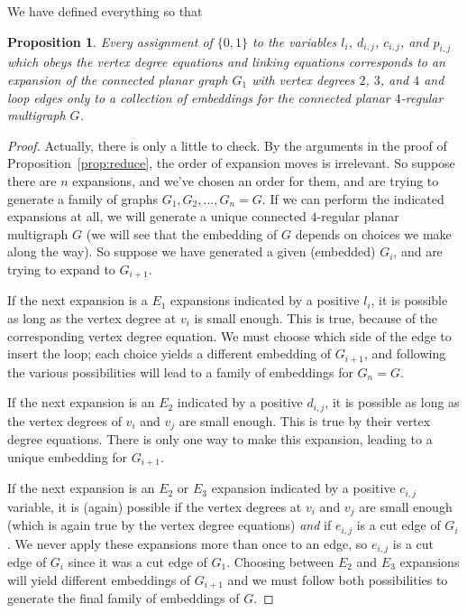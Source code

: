 \documentclass[amsmath,secnumarabic,floatfix,amssymb,nofootinbib,nobibnotes,letterpaper,11pt,tightenlines,showkeys]{revtex4}
\newtheorem{proposition}[theorem]{Proposition}
\theoremstyle{definition}
\newcommand{\loopinsert}{E_1}
\newcommand{\edgedouble}{E_2}
\newcommand{\cutedgedouble}{E_3}
\begin{document}
We have defined everything so that

\begin{proposition}
Every assignment of $\{0,1\}$ to the variables $l_i$, $d_{i,j}$, $c_{i,j}$, and $p_{i,j}$ which obeys the vertex degree equations and linking equations corresponds to an expansion of the connected planar graph $G_1$ with vertex degrees $2$, $3$, and $4$ and loop edges only to a collection of embeddings for the connected planar $4$-regular multigraph $G$.
\end{proposition}

\begin{proof}
Actually, there is only a little to check. By the arguments in the proof of Proposition~\ref{prop:reduce}, the order of expansion moves is irrelevant. So suppose there are $n$ expansions, and we've chosen an order for them,  and are trying to generate a family of graphs $G_1, G_2, \dots, G_n = G$. If we can perform the indicated expansions at all, we will generate a unique connected $4$-regular planar multigraph $G$ (we will see that the embedding of $G$ depends on choices we make along the way).  So suppose we have generated a given (embedded) $G_i$, and are trying to expand to $G_{i+1}$.

If the next expansion is a $\loopinsert$ expansions indicated by a positive $l_i$, it is possible as long as the vertex degree at $v_i$ is small enough. This is true, because of the corresponding vertex degree equation. 
We must choose which side of the edge to insert the loop; each choice yields a different embedding of $G_{i+1}$, and following the various possibilities will lead to a family of embeddings for $G_n = G$.

If the next expansion is an $\edgedouble$ indicated by a positive $d_{i,j}$, it is possible as long as the vertex degrees of $v_i$ and $v_j$ are small enough. This is true by their vertex degree equations. There is only one way to make this expansion, leading to a unique embedding for $G_{i+1}$.

If the next expansion is an $\edgedouble$ or $\cutedgedouble$ expansion indicated by a positive $c_{i,j}$ variable, it is (again) possible if the vertex degrees at $v_i$ and $v_j$ are small enough (which is again true by the vertex degree equations) \emph{and} if $e_{i,j}$ is a cut edge of $G_i$. We never apply these expansions more than once to an edge, so $e_{i,j}$ is a cut edge of $G_i$ since it was a cut edge of $G_1$. Choosing between $\edgedouble$ and $\cutedgedouble$ expansions will yield different embeddings of $G_{i+1}$ and we must follow both possibilities to generate the final family of embeddings of $G$.


\end{proof}
\end{document}
